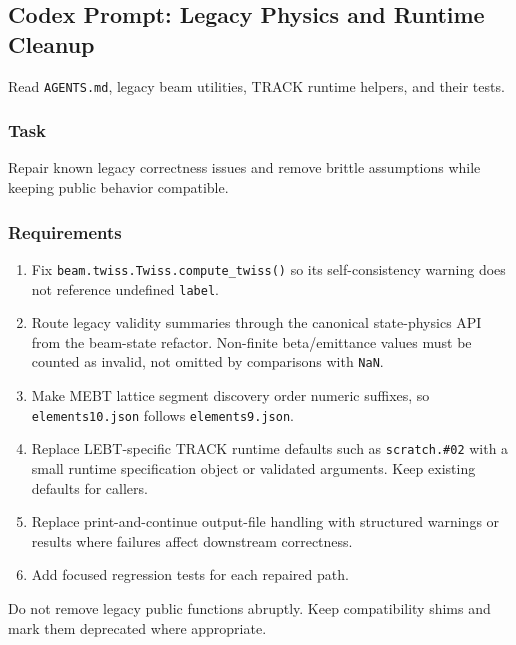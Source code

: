 \documentclass[
]{article}
\providecommand{\tightlist}{%
  \setlength{\itemsep}{0pt}\setlength{\parskip}{0pt}}
\begin{document}
\hypertarget{codex-prompt-legacy-physics-and-runtime-cleanup}{%
\subsection{Codex Prompt: Legacy Physics and Runtime
Cleanup}\label{codex-prompt-legacy-physics-and-runtime-cleanup}}

Read \texttt{AGENTS.md}, legacy beam utilities, TRACK runtime helpers,
and their tests.

\hypertarget{task-5}{%
\subsubsection{Task}\label{task-5}}

Repair known legacy correctness issues and remove brittle assumptions
while keeping public behavior compatible.

\hypertarget{requirements-5}{%
\subsubsection{Requirements}\label{requirements-5}}

\begin{enumerate}
\def\labelenumi{\arabic{enumi}.}
\tightlist
\item
  Fix \texttt{beam.twiss.Twiss.compute\_twiss()} so its self-consistency
  warning does not reference undefined \texttt{label}.
\item
  Route legacy validity summaries through the canonical state-physics
  API from the beam-state refactor. Non-finite beta/emittance values
  must be counted as invalid, not omitted by comparisons with
  \texttt{NaN}.
\item
  Make MEBT lattice segment discovery order numeric suffixes, so
  \texttt{elements10.json} follows \texttt{elements9.json}.
\item
  Replace LEBT-specific TRACK runtime defaults such as
  \texttt{scratch.\#02} with a small runtime specification object or
  validated arguments. Keep existing defaults for callers.
\item
  Replace print-and-continue output-file handling with structured
  warnings or results where failures affect downstream correctness.
\item
  Add focused regression tests for each repaired path.
\end{enumerate}

Do not remove legacy public functions abruptly. Keep compatibility shims
and mark them deprecated where appropriate.
\end{document}
